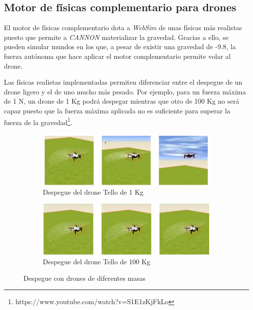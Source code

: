 \newpage
\subsection{Motor de físicas complementario para drones}
El motor de físicas complementario dota a \textit{WebSim} de unas físicas más realistas puesto que permite a \textit{CANNON} materializar la gravedad. Gracias a ello, se pueden simular mundos en los que, a pesar de existir una gravedad de -9.8, la fuerza autónoma que hace aplicar el motor complementario permite volar al drone. \newline

Las físicas realistas implementadas permiten diferenciar entre el despegue de un drone ligero y el de uno mucho más pesado. Por ejemplo, para un fuerza máxima de 1 N, un drone de 1 Kg podrá despegar mientras que otro de 100 Kg no será capaz puesto que la fuerza máxima aplicada no es suficiente para superar la fuerza de la gravedad\footnote{https://www.youtube.com/watch?v=S1E1zKjFkLo}.

\begin{figure}[h!]
  \centering
  \begin{subfigure}[b]{\textwidth}
    \includegraphics[scale=0.8]{masadrone_1.png}
    \caption{Despegue del drone Tello de 1 Kg}
  \end{subfigure}
  \hfill
  \begin{subfigure}[b]{\textwidth}
    \includegraphics[scale=0.8]{dronemasa_2.png}
    \caption{Despegue del drone Tello de 100 Kg}
  \end{subfigure}
\caption{Despegue con drones de diferentes masas}
\label{fig:masadrone}
\end{figure}


